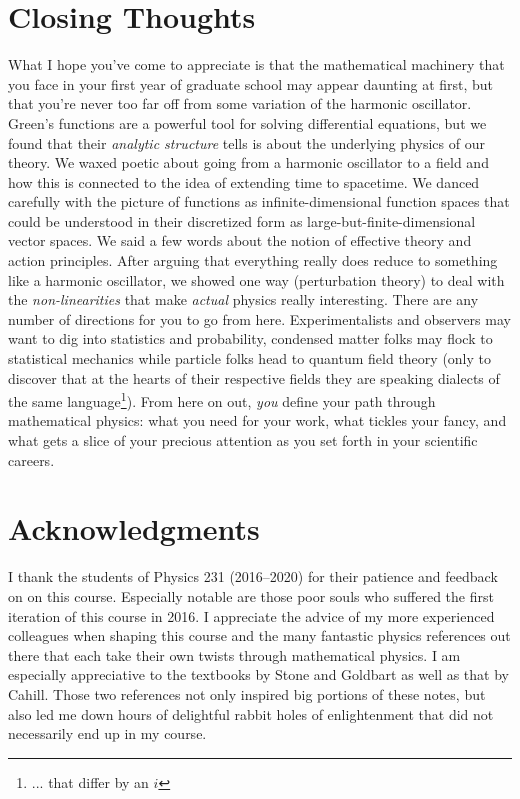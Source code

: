 
\section{Closing Thoughts}

What I hope you've come to appreciate is that the mathematical machinery that you face in your first year of graduate school may appear daunting at first, but that you're never too far off from some variation of the harmonic oscillator. Green's functions are a powerful tool for solving differential equations, but we found that their \emph{analytic structure} tells is about the underlying physics of our theory. We waxed poetic about going from a harmonic oscillator to a field and how this is connected to the idea of extending time to spacetime. We danced carefully with the picture of functions as infinite-dimensional function spaces that could be understood in their discretized form as large-but-finite-dimensional vector spaces. We said a few words about the notion of effective theory and action principles. After arguing that everything really does reduce to something like a harmonic oscillator, we showed one way (perturbation theory) to deal with the \emph{non-linearities} that make \emph{actual} physics really interesting. There are any number of directions for you to go from here. Experimentalists and observers may want to dig into statistics and probability, condensed matter folks may flock to statistical mechanics while particle folks head to quantum field theory (only to discover that at the hearts of their respective fields they are speaking dialects of the same language\footnote{... that differ by an $i$}). From here on out, \emph{you} define your path through mathematical physics: what you need for your work, what tickles your fancy, and what gets a slice of your precious attention as you set forth in your scientific careers.



\section*{Acknowledgments}
%
I thank the students of Physics 231 (2016--2020) for their patience and feedback on on this course. Especially notable are those poor souls who suffered the first iteration of this course in 2016. I appreciate the advice of my more experienced colleagues when shaping this course and the many fantastic physics references out there that each take their own twists through mathematical physics. I am especially appreciative to the textbooks by Stone and Goldbart as well as that by Cahill. Those two references not only inspired big portions of these notes, but also led me down hours of delightful rabbit holes of enlightenment that did not necessarily end up in my course.